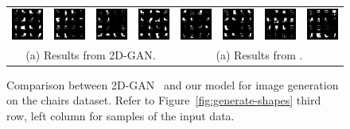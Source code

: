 \begin{figure}[t]
\setlength{\tabcolsep}{0pt}
\centering
\begin{tabular}{cccccccc}
\includegraphics[width=.12\linewidth]{prgan/fig/comparison/2dgan0.png} &
\includegraphics[width=.12\linewidth]{prgan/fig/comparison/2dgan3.png} &
\includegraphics[width=.12\linewidth]{prgan/fig/comparison/2dgan5.png} &
\includegraphics[width=.12\linewidth]{prgan/fig/comparison/2dgan7.png} \hfill&
\includegraphics[width=.12\linewidth]{prgan/fig/comparison/pr2dgan4.png} &
\includegraphics[width=.12\linewidth]{prgan/fig/comparison/pr2dgan5.png} &
\includegraphics[width=.12\linewidth]{prgan/fig/comparison/pr2dgan6.png} &
\includegraphics[width=.12\linewidth]{prgan/fig/comparison/pr2dgan3.png} \\
	\multicolumn{4}{c}{(a) Results from 2D-GAN.} \vspace{4pt} &
	\multicolumn{4}{c}{(a) Results from \prgan.} \vspace{4pt}
\end{tabular}
\caption{\label{fig:validation2} Comparison between 2D-GAN~\cite{goodfellow2014generative} and our \prgan model for image generation on the chairs dataset. Refer to Figure~\ref{fig:generate-shapes} third row, left column for samples of the input data.}
\end{figure}

